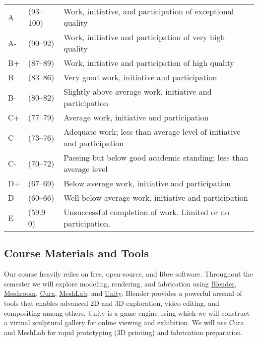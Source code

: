 \documentclass[12pt,letter,english]{report}
\begin{document}
\begin{tabularx}{\textwidth}{@{}l @{}l X@{}}
      A \hspace*{1em} & (93--100) & Work, initiative, and participation of exceptional quality             \\
      A-              & (90--92)  & Work, initiative and participation of very high quality                \\
      B+              & (87--89)  & Work, initiative and participation of high quality                     \\
      B               & (83--86)  & Very good work, initiative and participation                           \\
      B-              & (80--82)  & Slightly above average work, initiative and participation              \\
      C+              & (77--79)  & Average work, initiative and participation                             \\
      C               & (73--76)  & Adequate work; less than average level of initiative and participation \\
      C-              & (70--72)  & Passing but below good academic standing; less than average level      \\
      D+              & (67--69)  & Below average work, initiative and participation                       \\
      D               & (60--66)  & Well below average work, initiative and participation                  \\
      E               & (59.9--0) & Unsuccessful completion of work. Limited or no participation.
\end{tabularx}

\subsection{Course Materials and Tools}

Our course heavily relies on free, open-source, and libre software. Throughout the semester we will explore modeling, rendering, and fabrication using \href{http://blender.org/}{Blender}, \href{https://alicevision.org/#meshroom}{Meshroom}, \href{https://ultimaker.com/software/ultimaker-cura}{Cura}, \href{http://meshlab.net}{MeshLab}, and \href{https://unity.com/}{Unity}. Blender provides a powerful arsenal of tools that enables advanced 2D and 3D exploration, video editing, and compositing among others. Unity is a game engine using which we will construct a virtual sculptural gallery for online viewing and exhibition. We will use Cura and MeshLab for rapid prototyping (3D printing) and fabrication preparation.
\end{document}
